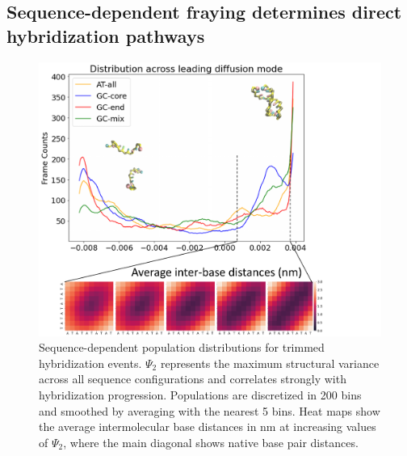 \documentclass[journal=jpcbfk,manuscript=article]{achemso}
\begin{document}



\subsection{Sequence-dependent fraying determines direct hybridization pathways} 

\begin{figure}[ht!]
	\begin{center}
        \includegraphics[width=150mm, scale=1]{Fig9.pdf}
        \caption{Sequence-dependent population distributions for trimmed hybridization events. $\Psi_2$ represents the maximum structural variance across all sequence configurations and correlates strongly with hybridization progression. Populations are discretized in 200 bins and smoothed by averaging with the nearest 5 bins. Heat maps show the average intermolecular base distances in nm at increasing values of $\Psi_2$, where the main diagonal shows native base pair distances.}
        \label{fig:Fig8}
	\end{center}
\end{figure}
\end{document}
